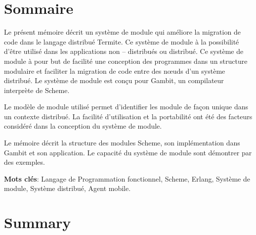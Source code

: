 \documentclass[12pt,initial,twoside,maitrise]{dms}
\numberwithin{equation}{section}
\numberwithin{table}{chapter}
\numberwithin{figure}{chapter}
\begin{document}
\maketitle



\francais{}

\chapter*{Sommaire}
Le présent mémoire décrit un système de module
qui améliore la migration de code dans le langage
distribué Termite. Ce système de module à la possibilité
d'être utilisé dans les applications non -- distribués
ou distribué. Ce système de module à pour but de facilité
une conception des programmes dans un structure modulaire
et faciliter la migration de code entre des nœuds
d'un système distribué. Le système de module est conçu pour
Gambit, un compilateur interprète de Scheme.

Le modèle de module utilisé permet d'identifier les module
de façon unique dans un contexte distribué. La facilité
d'utilisation et la portabilité ont été des facteurs considéré
dans la conception du système de module.

Le mémoire décrit la structure des modules Scheme, son implémentation
dans Gambit et son application. Le capacité du système de module sont
démontrer par des exemples.

\vspace*{1.5ex}
\noindent\textbf{Mots clés}: Langage de Programmation fonctionnel,
Scheme, Erlang, Système de module, Système distribué, Agent mobile.


\anglais{}
\chapter*{Summary}
\end{document}
